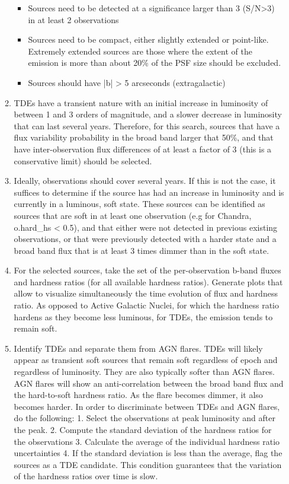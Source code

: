 \begin{enumerate}
\begin{enumerate}
    \begin{itemize}
    \item Sources need to be detected at a significance larger than 3 (S/N>3) in at least 2 observations
    \item Sources need to be compact, either slightly extended or point-like. Extremely extended sources are those where the extent of the emission is more than about 20\% of the PSF size should be excluded.
    \item Sources should have |b| > 5 arcseconds (extragalactic)
    \end{itemize}
  \item TDEs have a transient nature with an initial increase in luminosity of between 1 and 3 orders of magnitude, and a slower decrease in luminosity that can last several years. Therefore, for this search, sources that have a flux variability probability in the broad band larger that 50\%, and that have inter-observation flux differences of at least a factor of 3 (this is a conservative limit) should be selected.
  \item Ideally, observations should cover several years. If this is not the case, it suffices to determine if the source has had an increase in luminosity and is currently in a luminous, soft state. These sources can be identified as sources that are soft in at least one observation (e.g for Chandra, o.hard\_hs < 0.5), and that either were not detected in previous existing observations, or that were previously detected with a harder state and a broad band flux that is at least 3 times dimmer than in the soft state.
  \item For the selected sources, take the set of the per-observation b-band fluxes and hardness ratios (for all available hardness ratios). Generate plots that allow to visualize simultaneously the time evolution of flux and hardness ratio. As opposed to Active Galactic Nuclei, for which the hardness ratio hardens as they become less luminous, for TDEs, the emission tends to remain soft. 
  \item Identify TDEs and separate them from AGN flares. TDEs will likely appear as transient soft sources that remain soft regardless of epoch and regardless of luminosity. They are also typically softer than AGN flares. AGN flares will show an anti-correlation between the broad band flux and the hard-to-soft hardness ratio. As the flare becomes dimmer, it also becomes harder.  In order to discriminate between TDEs and AGN flares, do the following: 1. Select the observations at peak luminosity and after the peak.  2. Compute the standard deviation of the hardness ratios for the observations  3. Calculate the average of the individual hardness ratio uncertainties  4. If the standard deviation is less than the average, flag the sources as a TDE candidate.  This condition guarantees that the variation of the hardness ratios over time is slow.

\end{enumerate}
\end{enumerate}
